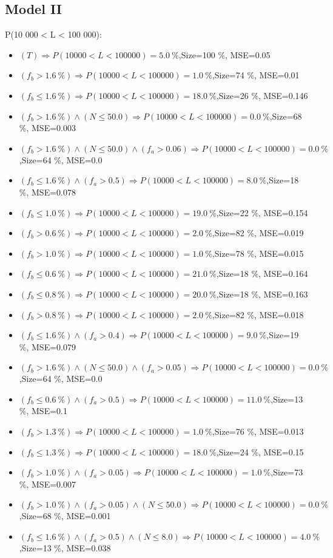 \documentclass[numbered]{CSL}
\begin{document}
\subsection{Model II}
P(10 000 < L < 100 000):
\begin{itemize}
\item $(T) \Rightarrow P(10 000 < L < 100 000) = 5.0~\%$,\hfill Size=100 \%, MSE=0.05
\item $(f_b > 1.6~\%) \Rightarrow P(10 000 < L < 100 000) = 1.0~\%$,\hfill Size=74 \%, MSE=0.01
\item $(f_b \leq 1.6~\%) \Rightarrow P(10 000 < L < 100 000) = 18.0~\%$,\hfill Size=26 \%, MSE=0.146
\item $(f_b > 1.6~\%) \land (N \leq 50.0) \Rightarrow P(10 000 < L < 100 000) = 0.0~\%$,\hfill Size=68 \%, MSE=0.003
\item $(f_b > 1.6~\%) \land (N \leq 50.0) \land (f_a > 0.06) \Rightarrow P(10 000 < L < 100 000) = 0.0~\%$,\hfill Size=64 \%, MSE=0.0
\item $(f_b \leq 1.6~\%) \land (f_a > 0.5) \Rightarrow P(10 000 < L < 100 000) = 8.0~\%$,\hfill Size=18 \%, MSE=0.078
\item $(f_b \leq 1.0~\%) \Rightarrow P(10 000 < L < 100 000) = 19.0~\%$,\hfill Size=22 \%, MSE=0.154
\item $(f_b > 0.6~\%) \Rightarrow P(10 000 < L < 100 000) = 2.0~\%$,\hfill Size=82 \%, MSE=0.019
\item $(f_b > 1.0~\%) \Rightarrow P(10 000 < L < 100 000) = 1.0~\%$,\hfill Size=78 \%, MSE=0.015
\item $(f_b \leq 0.6~\%) \Rightarrow P(10 000 < L < 100 000) = 21.0~\%$,\hfill Size=18 \%, MSE=0.164
\item $(f_b \leq 0.8~\%) \Rightarrow P(10 000 < L < 100 000) = 20.0~\%$,\hfill Size=18 \%, MSE=0.163
\item $(f_b > 0.8~\%) \Rightarrow P(10 000 < L < 100 000) = 2.0~\%$,\hfill Size=82 \%, MSE=0.018
\item $(f_b \leq 1.6~\%) \land (f_a > 0.4) \Rightarrow P(10 000 < L < 100 000) = 9.0~\%$,\hfill Size=19 \%, MSE=0.079
\item $(f_b > 1.6~\%) \land (N \leq 50.0) \land (f_a > 0.05) \Rightarrow P(10 000 < L < 100 000) = 0.0~\%$,\hfill Size=64 \%, MSE=0.0
\item $(f_b \leq 0.6~\%) \land (f_a > 0.5) \Rightarrow P(10 000 < L < 100 000) = 11.0~\%$,\hfill Size=13 \%, MSE=0.1
\item $(f_b > 1.3~\%) \Rightarrow P(10 000 < L < 100 000) = 1.0~\%$,\hfill Size=76 \%, MSE=0.013
\item $(f_b \leq 1.3~\%) \Rightarrow P(10 000 < L < 100 000) = 18.0~\%$,\hfill Size=24 \%, MSE=0.15
\item $(f_b > 1.0~\%) \land (f_a > 0.05) \Rightarrow P(10 000 < L < 100 000) = 1.0~\%$,\hfill Size=73 \%, MSE=0.007
\item $(f_b > 1.0~\%) \land (f_a > 0.05) \land (N \leq 50.0) \Rightarrow P(10 000 < L < 100 000) = 0.0~\%$,\hfill Size=68 \%, MSE=0.001
\item $(f_b \leq 1.6~\%) \land (f_a > 0.5) \land (N \leq 8.0) \Rightarrow P(10 000 < L < 100 000) = 4.0~\%$,\hfill Size=13 \%, MSE=0.038
\end{itemize}
\end{document}
